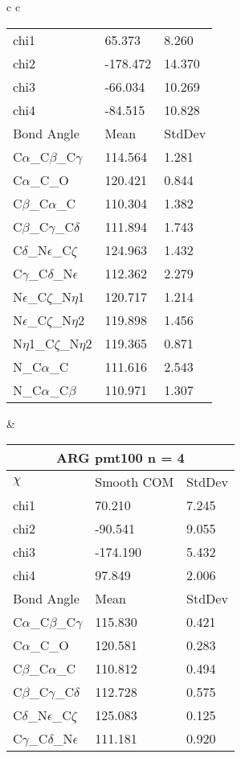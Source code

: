 \begin{longtable}{ c c }
\begin{tabular}{ l l l }
  chi1 & 65.373 & 8.260 \\ 
  chi2 & -178.472 & 14.370 \\ 
  chi3 & -66.034 & 10.269 \\ 
  chi4 & -84.515 & 10.828 \\ \midrule
  Bond Angle   & Mean     & StdDev \\ \midrule
  C$\alpha$\_C$\beta$\_C$\gamma$ & 114.564 & 1.281\\
  C$\alpha$\_C\_O & 120.421 & 0.844\\
  C$\beta$\_C$\alpha$\_C & 110.304 & 1.382\\
  C$\beta$\_C$\gamma$\_C$\delta$ & 111.894 & 1.743\\
  C$\delta$\_N$\epsilon$\_C$\zeta$ & 124.963 & 1.432\\
  C$\gamma$\_C$\delta$\_N$\epsilon$ & 112.362 & 2.279\\
  N$\epsilon$\_C$\zeta$\_N$\eta$1 & 120.717 & 1.214\\
  N$\epsilon$\_C$\zeta$\_N$\eta$2 & 119.898 & 1.456\\
  N$\eta$1\_C$\zeta$\_N$\eta$2 & 119.365 & 0.871\\
  N\_C$\alpha$\_C & 111.616 & 2.543\\
  N\_C$\alpha$\_C$\beta$ & 110.971 & 1.307\\
  \bottomrule
  \end{tabular}
  &
  \begin{tabular}{ l l l }
  \toprule
  \multicolumn{3}{c}{ARG \textbf{pmt100} n = 4} \\ \toprule
  $\chi$       & Smooth COM & StdDev \\ \midrule
  chi1 & 70.210 & 7.245 \\ 
  chi2 & -90.541 & 9.055 \\ 
  chi3 & -174.190 & 5.432 \\ 
  chi4 & 97.849 & 2.006 \\ \midrule
  Bond Angle   & Mean     & StdDev \\ \midrule
  C$\alpha$\_C$\beta$\_C$\gamma$ & 115.830 & 0.421\\
  C$\alpha$\_C\_O & 120.581 & 0.283\\
  C$\beta$\_C$\alpha$\_C & 110.812 & 0.494\\
  C$\beta$\_C$\gamma$\_C$\delta$ & 112.728 & 0.575\\
  C$\delta$\_N$\epsilon$\_C$\zeta$ & 125.083 & 0.125\\
  C$\gamma$\_C$\delta$\_N$\epsilon$ & 111.181 & 0.920\\

\end{tabular}
\end{longtable}
